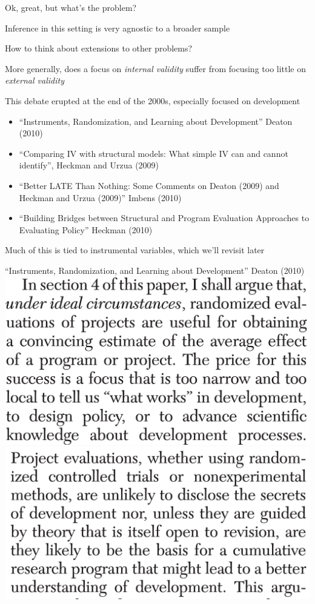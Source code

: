 \documentclass[notes,11pt, aspectratio=169]{beamer}
\newenvironment{wideitemize}{\itemize\addtolength{\itemsep}{10pt}}{\enditemize}
\begin{document}
\begin{frame}{Ok, great, but what's the problem?}
  \begin{wideitemize}
  \item Inference in this setting is very agnostic to a broader sample
  \item How to think about extensions to other problems?
  \item More generally, does a focus on \emph{internal validity}
    suffer from focusing too little on \emph{external validity}
  \item This debate erupted at the end of the 2000s, especially focused on development
    \begin{itemize}
    \item ``Instruments, Randomization, and Learning about Development'' Deaton (2010)
    \item ``Comparing IV with structural models: What simple IV can and cannot identify'', Heckman and Urzua (2009)
    \item ``Better LATE Than Nothing: Some Comments on Deaton (2009) and Heckman and Urzua (2009)'' Imbens (2010)
    \item ``Building Bridges between Structural and Program Evaluation Approaches to Evaluating Policy'' Heckman (2010)
    \end{itemize}
  \item Much of this is tied to instrumental variables, which we'll revisit later
    
  \end{wideitemize}
\end{frame}
\begin{frame}{``Instruments, Randomization, and Learning about Development'' Deaton (2010)}
  \includegraphics[width=0.4\linewidth]{images/eaton1.png}
    \includegraphics[width=0.4\linewidth]{images/deaton2.png}
\end{frame}
\end{document}
